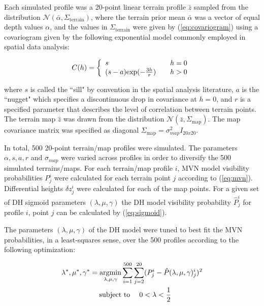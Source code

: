 Each simulated profile was a 20-point linear terrain profile $\bar{z}$ sampled from the distribution $\mathcal{N}(\bar{\alpha}, \Sigma_{\text{terrain}})$, where the terrain prior mean $\bar{\alpha}$ was a vector of equal depth values $\alpha$, and the values in $\Sigma_{\text{terrain}}$ were given by (\ref{eq:covariogram}) using a covariogram given by the following exponential model commonly employed in spatial data analysis:

\begin{equation}
C(h) = \left\{ 
  \begin{array}{l l}
    s & \quad h = 0\\
    (s-a)\text{exp}(-\frac{3h}{r}) & \quad h > 0
  \end{array} \right.
  \label{eq:covariogram}
\end{equation}

\noindent where $s$ is called the ``sill" by convention in the spatial analysis literature, $a$ is the ``nugget" which specifies a discontinuous drop in covariance at $h = 0$,  and $r$ is a specified parameter that describes the level of correlation between terrain points.
The terrain map $\hat{z}$ was drawn from the distribution $\mathcal{N}(\bar{z}, \Sigma_{\text{map}})$.  The map covariance matrix was specified as diagonal $\Sigma_{\text{map}} = \sigma_{map}^2 I_{20x20}$.

In total, 500 20-point terrain/map profiles were simulated.  The parameters $\alpha, s, a, r$ and $\sigma_{map}$ were varied across profiles in order to diversify the 500 simulated terrains/maps.  For each terrain/map profile $i$, MVN model visibility probabilities $P_j^i$ were calculated for each terrain point $j$ according to (\ref{eq:mvn}).  Differential heights $\delta z_j^i$ were calculated for each of the map points.  For a given set of DH sigmoid parameters $(\lambda, \mu, \gamma)$ the DH model visibility probability $\hat{P}_j^i$ for profile $i$, point $j$ can be calculated by (\ref{eq:sigmoid}).

The parameters $(\lambda, \mu, \gamma)$ of the DH model were tuned to best fit the MVN probabilities, in a least-squares sense, over the 500 profiles according to the following optimization:

\begin{align}
\begin{split}
\lambda^*, \mu^*, \gamma^* &= \underset{\lambda, \mu, \gamma}{\text{argmin}} \sum_{i=1}^{500} \sum_{j=2}^{20} (P_j^{i} - \hat{P}(\lambda, \mu, \gamma)_j^{i})^2 \\
& \hspace{3ex} \text{subject to} \hspace{3ex} 0 < \lambda < \frac{1}{2}
\label{eq:optSim}
\end{split}
\end{align}

